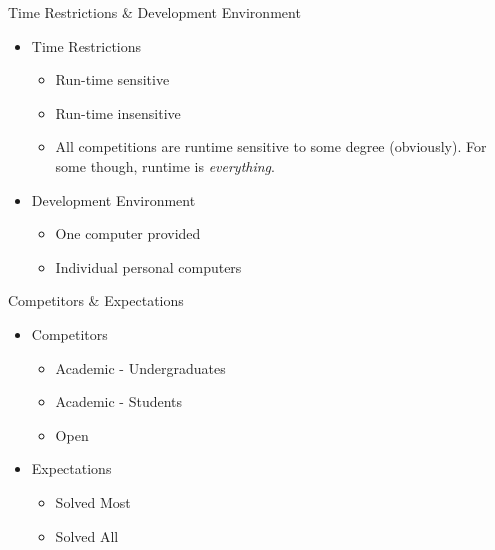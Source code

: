 \documentclass{beamer}
\begin{document}
\begin{frame}{Time Restrictions \& Development Environment}
  \begin{centering}
    \begin{itemize}
      \item Time Restrictions
      \begin{itemize}
        \item Run-time sensitive
        \item Run-time insensitive
        \item All competitions are runtime sensitive to some degree (obviously). For some though, runtime is \textit{everything}.
      \end{itemize}
      \item Development Environment
      \begin{itemize}
        \item One computer provided
        \item Individual personal computers
      \end{itemize}
    \end{itemize}
  \end{centering}
\end{frame}

\begin{frame}{Competitors \& Expectations}
  \begin{centering}
    \begin{itemize}
      \item Competitors
      \begin{itemize}
        \item Academic - Undergraduates
        \item Academic - Students
        \item Open
      \end{itemize}
      \item Expectations
      \begin{itemize}
        \item Solved Most
        \item Solved All
      \end{itemize}
    \end{itemize}
  \end{centering}
\end{frame}
      
\end{document}
